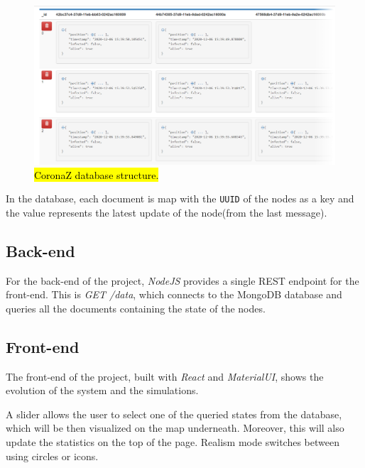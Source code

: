 \documentclass[conference]{IEEEtran}
\begin{document}
		\begin{figure}[htbp]
			\centerline{\includegraphics[width=\linewidth]{img/database.png}}
			\caption{\hl{CoronaZ database structure.}}
			\label{fig:database}
		\end{figure}
	
		In the database, each document is map with the \texttt{UUID} of the nodes as a key and the value represents the latest update of the node(from the last message).
	
	\subsection{Back-end}
	
		For the back-end of the project, \textit{NodeJS} provides a single REST endpoint for the front-end. This is \textit{GET /data}, which connects to the MongoDB database and queries all the documents containing the state of the nodes.
	
	\subsection{Front-end}

		The front-end of the project, built with \textit{React} and \textit{MaterialUI}, shows the evolution of the system and the simulations.
		
		A slider allows the user to select one of the queried states from the database, which will be then visualized on the map underneath. Moreover, this will also update the statistics on the top of the page. Realism mode switches between using circles or icons.
		
\end{document}
